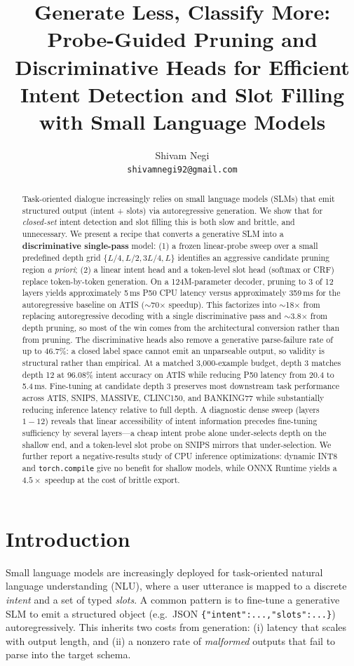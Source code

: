 \documentclass{article}
\title{Generate Less, Classify More: Probe-Guided Pruning and\\
Discriminative Heads for Efficient Intent Detection and Slot Filling\\
with Small Language Models}
\author{Shivam Negi\\
\texttt{shivamnegi92@gmail.com}}
\date{}
\begin{document}
\maketitle

\begin{abstract}
Task-oriented dialogue increasingly relies on small language models (SLMs) that
emit structured output (intent + slots) via autoregressive generation. We show
that for \emph{closed-set} intent detection and slot filling this is both slow
and brittle, and unnecessary. We present a recipe that converts a generative SLM
into a \textbf{discriminative single-pass} model: (1) a frozen linear-probe
sweep over a small predefined depth grid $\{L/4, L/2, 3L/4, L\}$ identifies an
aggressive candidate pruning region \emph{a priori}; (2) a linear intent head
and a token-level slot head (softmax or CRF) replace token-by-token
generation. On a 124M-parameter decoder, pruning to 3 of 12 layers yields
approximately 5\,ms P50 CPU latency versus approximately 359\,ms for the
autoregressive baseline on ATIS ($\sim$70$\times$ speedup). This factorizes
into $\sim$18$\times$ from replacing autoregressive decoding with a single
discriminative pass and $\sim$3.8$\times$ from depth pruning, so most of the
win comes from the architectural conversion rather than from pruning. The
discriminative heads also remove a generative parse-failure rate of up to
46.7\%: a closed label space cannot emit an unparseable output, so validity
is structural rather than empirical. At a
matched 3{,}000-example budget, depth 3 matches depth 12 at 96.08\% intent
accuracy on ATIS while reducing P50 latency from 20.4 to 5.4\,ms. Fine-tuning
at candidate depth 3 preserves most downstream task performance across ATIS,
SNIPS, MASSIVE, CLINC150, and BANKING77 while substantially reducing
inference latency relative to full depth. A diagnostic dense sweep (layers
$1{-}12$) reveals that linear accessibility of intent information precedes
fine-tuning sufficiency by several layers---a cheap intent probe alone
under-selects depth on the shallow end, and a token-level slot probe on
SNIPS mirrors that under-selection. We further report a negative-results
study of CPU inference optimizations: dynamic INT8 and \texttt{torch.compile}
give no benefit for shallow models, while ONNX Runtime yields a $4.5\times$
speedup at the cost of brittle export.
\end{abstract}

\section{Introduction}\label{sec:introduction}
Small language models are increasingly deployed for task-oriented natural
language understanding (NLU), where a user utterance is mapped to a discrete
\emph{intent} and a set of typed \emph{slots}. A common pattern is to fine-tune
a generative SLM to emit a structured object (e.g.\ JSON
\texttt{\{"intent":...,"slots":...\}}) autoregressively. This inherits two costs
from generation: (i) latency that scales with output length, and (ii) a nonzero
rate of \emph{malformed} outputs that fail to parse into the target schema.
\end{document}
